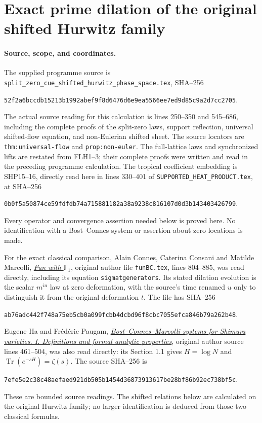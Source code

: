 \section{Exact prime dilation of the original shifted Hurwitz family}
\label{sec:HPS}

\paragraph{Source, scope, and coordinates.}
The supplied programme source is
\texttt{split\_\allowbreak zero\_\allowbreak cue\_\allowbreak shifted\_\allowbreak hurwitz\_\allowbreak phase\_\allowbreak space.tex},
SHA--256
\begin{center}\small
\nolinkurl{52f2a6bccdb15213b1992abef9f8d6476d6e9ea5566ee7ed9d85c9a2d7cc2705}.
\end{center}
The actual source reading for this calculation is lines
250--350 and 545--686, including the complete proofs of the
split-zero laws, support reflection, universal shifted-flow
equation, and non-Eulerian shifted sheet. The source locators
are \texttt{thm:universal-flow} and \texttt{prop:non-euler}.
The full-lattice laws and synchronized lifts are restated
from FLH1--3; their complete proofs were written and read
in the preceding programme calculation. The tropical
coefficient embedding is SHP15--16, directly read here
in lines 330--401 of \texttt{SUPPORTED\_\allowbreak HEAT\_\allowbreak PRODUCT.tex},
at SHA--256
\begin{center}\small
\nolinkurl{0b0f5a50874ce59fdfdb74a715881182a38a9238c816107d0d3b143403426799}.
\end{center}
Every operator and convergence assertion needed below is
proved here. No identification with a Bost--Connes system
or assertion about zero locations is made.

For the exact classical comparison, Alain Connes,
Caterina Consani and Matilde Marcolli,
\href{https://arxiv.org/abs/0806.2401v1}
{\emph{Fun with $\mathbb F_1$}}, original author file
\nolinkurl{funBC.tex}, lines 804--885, was read directly,
including its equation \texttt{sigmatgenerators}.
Its stated dilation evolution is the scalar
$m^{iu}$ law at zero deformation, with the
source's time renamed $u$ only to distinguish
it from the original deformation $t$.
The file has SHA--256
\begin{center}\small
\nolinkurl{ab76adc442f748a75eb5cb0a099fcbb4dcbd96f8cbc7055efca846b79a262b48}.
\end{center}
Eugene Ha and Fr\'ed\'eric Paugam,
\href{https://arxiv.org/abs/math/0507101v1}
{\emph{Bost--Connes--Marcolli systems for Shimura
varieties. I. Definitions and formal analytic properties}},
original author source lines 461--504, was also
read directly: its Section 1.1 gives $H=\log N$
and $\operatorname{Tr}(e^{-sH})=\zeta(s)$.
The source SHA--256 is
\begin{center}\small
\nolinkurl{7efe5e2c38c48aefaed921db505b1454d36873913617be28bf86b92ec738bf5c}.
\end{center}
These are bounded source readings. The shifted
relations below are calculated on the original
Hurwitz family; no larger identification is
deduced from those two classical formulas.

